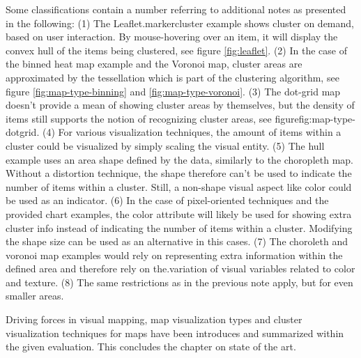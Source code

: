 Some classifications contain a number referring to additional notes as presented in the following: (1) The Leaflet.markercluster example shows cluster on demand, based on user interaction. By mouse-hovering over an item, it will display the convex hull of the items being clustered, see figure \ref{fig:leaflet}. (2) In the case of the binned heat map example and the Voronoi map, cluster areas are approximated by the tessellation which is part of the clustering algorithm, see figure \ref{fig:map-type-binning} and \ref{fig:map-type-voronoi}. (3) The dot-grid map doesn't provide a mean of showing cluster areas by themselves, but the density of items still supports the notion of recognizing cluster areas, see figure{fig:map-type-dotgrid}. (4) For various visualization techniques, the amount of items within a cluster could be visualized by simply scaling the visual entity. (5) The hull example uses an area shape defined by the data, similarly to the choropleth map. Without a distortion technique, the shape therefore can't be used to indicate the number of items within a cluster. Still, a non-shape visual aspect like color could be used as an indicator. (6) In the case of pixel-oriented techniques and the provided chart examples, the color attribute will likely be used for showing extra cluster info instead of indicating the number of items within a cluster. Modifying the shape size can be used as an alternative in this cases. (7) The choroleth and voronoi map examples would rely on representing extra information within the defined area and therefore rely on the.variation of visual variables related to color and texture. (8) The same restrictions as in the previous note apply, but for even smaller areas.

Driving forces in visual mapping, map visualization types and cluster visualization techniques for maps have been introduces and summarized within the given evaluation. This concludes the chapter on state of the art. 

